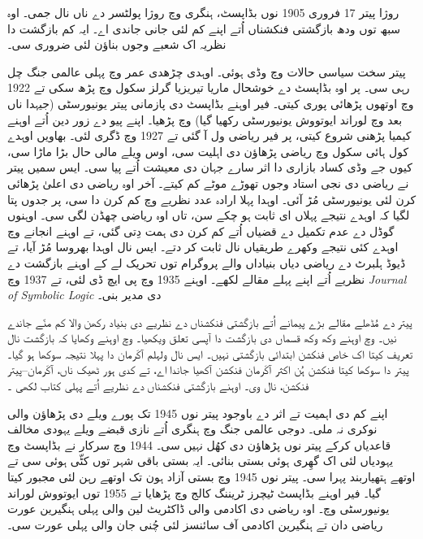 \documentclass[../../../include/open-logic-section]{subfiles}
\begin{document}



روژا پیتر 17 فروری 1905 نوں بڈاپسٹ، ہنگری وچ روژا پولٹسر دے ناں نال جمی۔ اوہ سبھ توں ودھ بازگشتی فنکشناں اُتے اپنے کم لئی جانی جاندی اے۔ ایہ کم بازگشت دا نظریہ اک شعبے وجوں بناؤن لئی ضروری سی۔

پیتر سخت سیاسی حالات وچ وڈی ہوئی۔ اوہدی چڑھدی عمر وچ پہلی عالمی جنگ چل رہی سی۔ پر اوہ بڈاپسٹ دے خوشحال ماریا تیریزیا گرلز سکول وچ پڑھ سکی تے 1922 وچ اوتھوں پڑھائی پوری کیتی۔ فیر اوہنے بڈاپسٹ دی پازمانی پیتر یونیورسٹی (جیہدا ناں بعد وچ لوراند ایوتووش یونیورسٹی رکھیا گیا) وچ پڑھیا۔ اپنے پیو دے زور دین اُتے اوہنے کیمیا پڑھنی شروع کیتی، پر فیر ریاضی ول آ گئی تے 1927 وچ ڈگری لئی۔ بھاویں اوہدے کول ہائی سکول وچ ریاضی پڑھاؤن دی اہلیت سی، اوس ویلے مالی حال بڑا ماڑا سی، کیوں جے وڈی کساد بازاری دا اثر سارے جہان دی معیشت اُتے پیا سی۔ ایس سمیں پیتر نے ریاضی دی نجی استاد وجوں تھوڑے موٹے کم کیتے۔ آخر اوہ ریاضی دی اعلیٰ پڑھائی کرن لئی یونیورسٹی مُڑ آئی۔ اوہدا پہلا ارادہ عدد نظریے وچ کم کرن دا سی، پر جدوں پتا لگیا کہ اوہدے نتیجے پہلاں ای ثابت ہو چکے سن، تاں اوہ ریاضی چھڈن لگی سی۔ اوہنوں گوڈل دے عدم تکمیل دے قضیاں اُتے کم کرن دی ہمت دِتی گئی، تے اوہنے انجانے وچ اوہدے کئی نتیجے وکھرے طریقیاں نال ثابت کر دتے۔ ایس نال اوہدا بھروسا مُڑ آیا، تے ڈیوڈ ہلبرٹ دے ریاضی دیاں بنیاداں والے پروگرام توں تحریک لے کے اوہنے بازگشت دے نظریے اُتے اپنے پہلے مقالے لکھے۔ اوہنے 1935 وچ پی ایچ ڈی لئی، تے 1937 وچ \emph{Journal of
  Symbolic Logic} دی مدیر بنی۔

پیتر دے مُڈھلے مقالے بڑے پیمانے اُتے بازگشتی فنکشناں دے نظریے دی بنیاد رکھن والا کم منّے جاندے نیں۔ \cite{Peter1935a} وچ اوہنے وکھ وکھ قسماں دی بازگشت دا آپسی تعلق ویکھیا۔ \cite{Peter1935b} وچ اوہنے وکھایا کہ بازگشت نال تعریف کیتا اک خاص فنکشن ابتدائی بازگشتی نہیں۔ ایس نال ولہلم آکَرمان دا پہلا نتیجہ سوکھا ہو گیا۔ پیتر دا سوکھا کیتا فنکشن ہُن اکثر آکَرمان فنکشن آکھیا جاندا اے، تے کدی ہور ٹھیک ناں، آکَرمان–پیتر فنکشن، نال وی۔ اوہنے بازگشتی فنکشناں دے نظریے اُتے پہلی کتاب لکھی \citep{Peter1951}۔

اپنے کم دی اہمیت تے اثر دے باوجود پیتر نوں 1945 تک پورے ویلے دی پڑھاؤن والی نوکری نہ ملی۔ دوجی عالمی جنگ وچ ہنگری اُتے نازی قبضے ویلے یہودی مخالف قاعدیاں کرکے پیتر نوں پڑھاؤن دی کھُل نہیں سی۔ 1944 وچ سرکار نے بڈاپسٹ وچ یہودیاں لئی اک گھِری ہوئی بستی بنائی۔ ایہ بستی باقی شہر توں کٹّی ہوئی سی تے اوتھے ہتھیاربند پہرا سی۔ پیتر نوں 1945 وچ بستی آزاد ہون تک اوتھے رہن لئی مجبور کیتا گیا۔ فیر اوہنے بڈاپسٹ ٹیچرز ٹریننگ کالج وچ پڑھایا تے 1955 توں ایوتووش لوراند یونیورسٹی وچ۔ اوہ ریاضی دی اکادمی والی ڈاکٹریٹ لین والی پہلی ہنگیرین عورت ریاضی دان تے ہنگیرین اکادمی آف سائنسز لئی چُنی جان والی پہلی عورت سی۔
\end{document}
